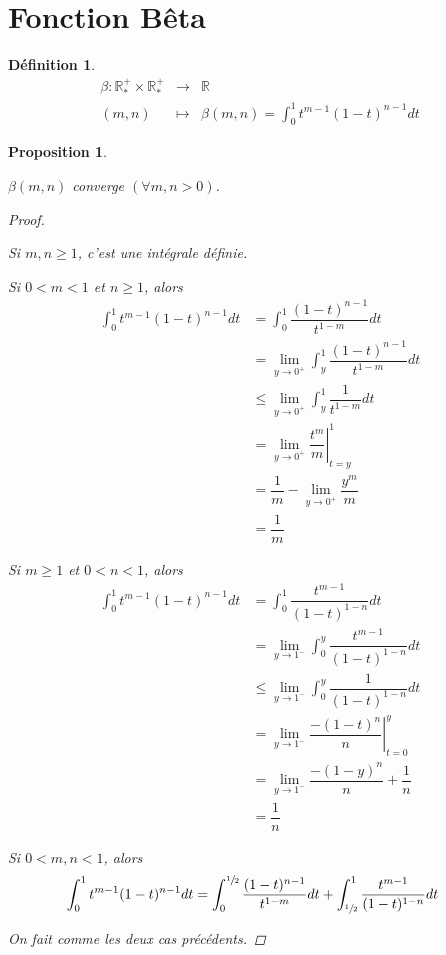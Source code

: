 \documentclass{report}
\newcommand*{\dlim}[3]{\displaystyle\lim_{#1 \to #2}#3}
\newcommand*{\dint}[3]{\displaystyle\int_{#1}^{#2}#3}
\newcommand*{\lte}{\leqslant}
\newcommand*{\gte}{\geqslant}
\newcommand*{\reels}{\mathbb{R}}
\newtheorem*{prop}{Proposition}
\theoremstyle{definition}
\newtheorem*{defin}{D\'efinition}
\theoremstyle{remark}
\begin{document}
	\section{Fonction B\^eta}
	\begin{defin}
		\begin{equation*}
			\begin{array}{rcl}
				\beta: \reels_*^+ \times \reels_*^+ &\to& \reels\\
				(m,n) &\mapsto& \beta(m,n) = \dint{0}{1}{t^{m-1}(1-t)^{n-1} dt}
			\end{array}
		\end{equation*}
	\end{defin}
	\begin{prop}~

		$\beta(m,n)$ converge $(\forall m,n > 0)$.
		\begin{proof}~

			Si $m,n \gte 1$, c'est une int\'egrale d\'efinie.

			Si $0<m<1$ et $n \gte 1$, alors
			\begin{align*}
				\dint{0}{1}{t^{m-1}(1-t)^{n-1}dt}&= \dint{0}{1}{\dfrac{(1-t)^{n-1}}{t^{1-m}} dt}\\
				&= \dlim{y}{0^+}{\dint{y}{1}{\dfrac{(1-t)^{n-1}}{t^{1-m}} dt}}\\
				&\lte \dlim{y}{0^+}{\dint{y}{1}{\dfrac{1}{t^{1-m}} dt}}\\
				&= \dlim{y}{0^+}{\left. \dfrac{t^m}{m} \right|_{t=y}^1}\\
				&= \dfrac{1}{m} - \dlim{y}{0^+}{\dfrac{y^m}{m}}\\
				&=\dfrac{1}{m}
			\end{align*}

			Si $m \gte 1$ et $0<n<1$, alors
			\begin{align*}
				\dint{0}{1}{t^{m-1}(1-t)^{n-1}dt}&= \dint{0}{1}{\dfrac{t^{m-1}}{(1-t)^{1-n}} dt}\\
				&= \dlim{y}{1^-}{\dint{0}{y}{\dfrac{t^{m-1}}{(1-t)^{1-n}} dt}}\\
				&\lte \dlim{y}{1^-}{\dint{0}{y}{\dfrac{1}{(1-t)^{1-n}} dt}}\\
				&= \dlim{y}{1^-}{\left. \dfrac{-(1-t)^n}{n} \right|_{t=0}^y}\\
				&= \dlim{y}{1^-}{\dfrac{-(1-y)^n}{n}} + \dfrac{1}{n}\\
				&= \dfrac{1}{n}
			\end{align*}

			Si $0<m,n<1$, alors
			\begin{align*}
				\dint{0}{1}{t^{m-1}(1-t)^{n-1} dt}&= \dint{0}{\sfrac{1}{2}}{\dfrac{(1-t)^{n-1}}{t^{1-m}} dt} + \dint{\sfrac{1}{2}}{1}{\dfrac{t^{m-1}}{(1-t)^{1-n}} dt}
			\end{align*}

			On fait comme les deux cas pr\'ec\'edents.%
		\end{proof}
	\end{prop}
\end{document}
